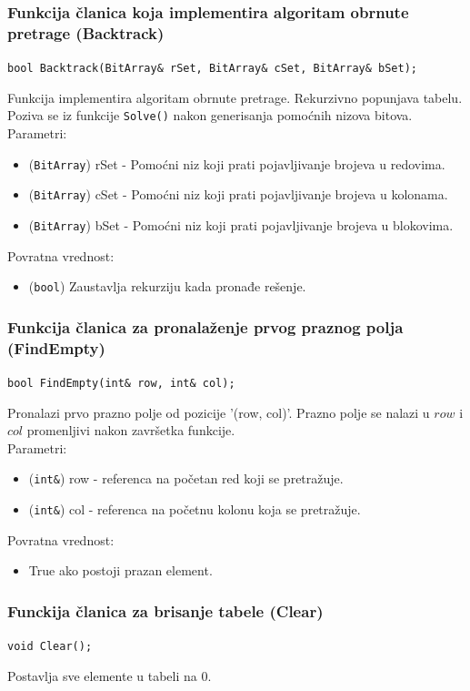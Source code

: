 \documentclass[a4paper]{article}
\begin{document}
    \subsubsection{Funkcija članica koja implementira algoritam obrnute pretrage (Backtrack)}
    {\parindent0pt
    \texttt{bool Backtrack(BitArray\& rSet, BitArray\& cSet, BitArray\& bSet);}
    }
    \par Funkcija implementira algoritam obrnute pretrage. Rekurzivno popunjava tabelu. Poziva se iz funkcije \texttt{Solve()} nakon generisanja pomoćnih nizova bitova.
    Parametri:
    \begin{itemize}
        \item (\texttt{BitArray}) rSet - Pomoćni niz koji prati pojavljivanje brojeva u redovima.
        \item (\texttt{BitArray}) cSet - Pomoćni niz koji prati pojavljivanje brojeva u kolonama.
        \item (\texttt{BitArray}) bSet - Pomoćni niz koji prati pojavljivanje brojeva u blokovima.
    \end{itemize}
    Povratna vrednost:
    \begin{itemize}
        \item (\texttt{bool}) Zaustavlja rekurziju kada pronađe rešenje.
    \end{itemize}

    \subsubsection{Funkcija članica za pronalaženje prvog praznog polja (FindEmpty)}
	\texttt{bool FindEmpty(int\& row, int\& col);}
    \par Pronalazi prvo prazno polje od pozicije '(row, col)'. Prazno polje se nalazi u $row$ i $col$ promenljivi nakon završetka funkcije.\\
    Parametri:
    \begin{itemize}
        \item (\texttt{int\&}) row - referenca na početan red koji se pretražuje.
        \item (\texttt{int\&}) col - referenca na početnu kolonu koja se pretražuje.
    \end{itemize}
    Povratna vrednost:
    \begin{itemize}
        \item True ako postoji prazan element.
    \end{itemize}

    \subsubsection{Funckija članica za brisanje tabele (Clear)}
    \texttt{void Clear();}
    \par Postavlja sve elemente u tabeli na 0.
\end{document}
